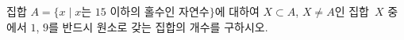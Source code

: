 집합 $A=\{x \mid x$는 $15$ 이하의 홀수인 자연수$\}$에 대하여 $X\subset A$, $X\ne A$인 집합~$X$ 중에서 $1$, $9$를 반드시 원소로 갖는 집합의 개수를 구하시오.
